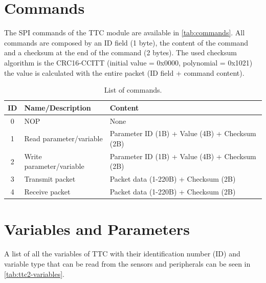 \section{Commands}

The SPI commands of the TTC module are available in \autoref{tab:commands}. All commands are composed by an ID field (1 byte), the content of the command and a checksum at the end of the command (2 bytes). The used checksum algorithm is the CRC16-CCITT  (initial value = 0x0000, polynomial = 0x1021) the value is calculated with the entire packet (ID field + command content).

\begin{table}[!h]
    \centering
    \begin{tabular}{cll}
        \toprule[1.5pt]
        \textbf{ID} & \textbf{Name/Description} & \textbf{Content}\\
        \midrule
        0   & NOP                       & None \\
        1   & Read parameter/variable   & Parameter ID (1B) + Value (4B) + Checksum (2B) \\
        2   & Write parameter/variable  & Parameter ID (1B) + Value (4B) + Checksum (2B) \\
        3   & Transmit packet           & Packet data (1-220B) + Checksum (2B) \\
        4   & Receive packet            & Packet data (1-220B) + Checksum (2B) \\
        \bottomrule[1.5pt]
    \end{tabular}
    \caption{List of commands.}
    \label{tab:commands}
\end{table}

\section{Variables and Parameters}

A list of all the variables of TTC with their identification number (ID) and variable type that can be read from the sensors and peripherals can be seen in \autoref{tab:ttc2-variables}.

